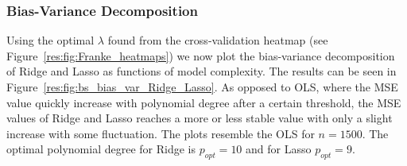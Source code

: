 \documentclass[twocolumn,english,notitlepage]{article}
\begin{document}
        \subsubsection{Bias-Variance Decomposition}
            Using the optimal $\lambda$ found from the cross-validation heatmap (see Figure~\ref{res:fig:Franke_heatmaps}) we now plot the bias-variance decomposition of Ridge and Lasso as functions of model complexity. The results can be seen in Figure~\ref{res:fig:bs_bias_var_Ridge_Lasso}. As opposed to OLS, where the MSE value quickly increase with polynomial degree after a certain threshold, the MSE values of Ridge and Lasso reaches a more or less stable value with only a slight increase with some fluctuation. The plots resemble the OLS for $n=1500$. The optimal polynomial degree for Ridge is $p_{opt} = 10$ and for Lasso $p_{opt} = 9$.
\end{document}

